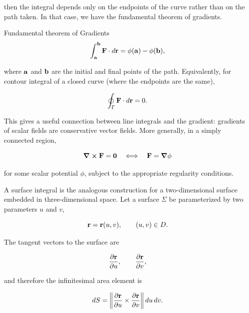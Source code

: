 			then the integral depends only on the endpoints of the curve rather than on the path taken. In that case, we have the fundamental theorem of gradients.
			\begin{theorem}{Fundamental theorem of Gradients}
				\begin{equation}
					\int_{\vb{a}}^{\vb{b}} \vb F\cdot d\vb r
					=
					\phi(\vb a)-\phi(\vb b),
				\end{equation}
			\end{theorem}
			where $\vb a$ and $\vb b$ are the initial and final points of the path. Equivalently, for contour integral of a closed curve (where the endpoints are the same),

			\begin{equation}
				\oint_\Gamma \vb F\cdot d\vb r = 0.
			\end{equation}

			This gives a useful connection between line integrals and the gradient: gradients of scalar fields are conservative vector fields. More generally, in a simply connected region,

			\begin{equation}
				\curl \vb F = \vb 0
				\quad\Longleftrightarrow\quad
				\vb F = \grad \phi
			\end{equation}

			for some scalar potential $\phi$, subject to the appropriate regularity conditions.


			A surface integral is the analogous construction for a two-dimensional surface embedded in three-dimensional space. Let a surface $\Sigma$ be parameterized by two parameters $u$ and $v$,

			\begin{equation}
				\vb r = \vb r(u,v),
				\qquad
				(u,v)\in D.
			\end{equation}

			The tangent vectors to the surface are

			\begin{equation}
				\pdv{\vb r}{u},
				\qquad
				\pdv{\vb r}{v},
			\end{equation}

			and therefore the infinitesimal area element is

			\begin{equation}
				\dd{S}
				=
				\norm{
					\pdv{\vb r}{u}
					\times
					\pdv{\vb r}{v}
				}
				\,du\,dv.
			\end{equation}


